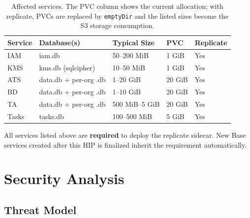 \documentclass[11pt]{article}
\begin{document}
\begin{table}[H]
\centering
\begin{tabular}{@{}lllll@{}}
\toprule
\textbf{Service} & \textbf{Database(s)} & \textbf{Typical Size} & \textbf{PVC} & \textbf{Replicate} \\
\midrule
IAM     & iam.db                    & 50--200 MiB   & 1 GiB  & Yes \\
KMS     & kms.db (sqlcipher)        & 10--50 MiB    & 1 GiB  & Yes \\
ATS     & data.db + per-org .db     & 1--20 GiB     & 20 GiB & Yes \\
BD      & data.db + per-org .db     & 1--10 GiB     & 20 GiB & Yes \\
TA      & data.db + per-org .db     & 500 MiB--5 GiB & 20 GiB & Yes \\
Tasks   & tasks.db                  & 100--500 MiB  & 5 GiB  & Yes \\
\bottomrule
\end{tabular}
\caption{Affected services. The PVC column shows the current allocation; with
replicate, PVCs are replaced by \texttt{emptyDir} and the listed sizes
become the S3 storage consumption.}
\label{tab:services}
\end{table}

All services listed above are \textbf{required} to deploy the replicate
sidecar. New Base services created after this HIP is finalized inherit the
requirement automatically.

\section{Security Analysis}

\subsection{Threat Model}
\end{document}

